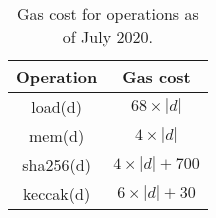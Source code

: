 \begin{table}[]
\begin{tabular}{|c|c|}
\hline
\textbf{Operation} & \textbf{Gas cost} \\ \hline
\textsf{load}(d)            & $68 \times |d|$          \\ \hline
\textsf{mem}(d)             & $4 \times |d|$           \\ \hline
\textsf{sha256}(d)          & $4 \times |d| + 700$     \\ \hline
\textsf{keccak}(d)          & $6 \times |d| + 30$      \\ \hline
\end{tabular}
\caption{Gas cost for operations as of July 2020.}
\label{tab:operations-gas}
\end{table}
